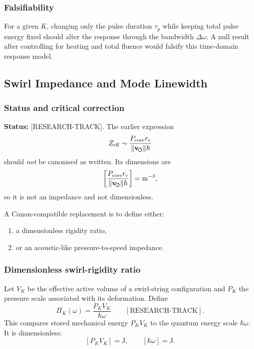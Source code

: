     \subsubsection*{Falsifiability}
        
        For a given \(K\), changing only the pulse duration \(\tau_p\) while keeping total pulse energy fixed should alter the response through the bandwidth \(\Delta\omega\). A null result after controlling for heating and total fluence would falsify this time-domain response model.

\subsection{Swirl Impedance and Mode Linewidth}
    \label{app:swirl-impedance-linewidth}
    
    \subsubsection*{Status and critical correction}
        
        \noindent
        \textbf{Status:} [RESEARCH-TRACK].
        The earlier expression
        \[
            Z_{\mathrm{eff}} \sim \frac{P_{\mathrm{core}}r_c}{\lVert\mathbf{v}_{\!\boldsymbol{\circlearrowleft}}\rVert\hbar}
        \]
        should \emph{not} be canonised as written. Its dimensions are
        \[
            \left[
                \frac{P_{\mathrm{core}}r_c}{\lVert\mathbf{v}_{\!\boldsymbol{\circlearrowleft}}\rVert\hbar}
            \right]
            =
            \mathrm{m^{-3}},
        \]
        so it is not an impedance and not dimensionless.
        
        A Canon-compatible replacement is to define either:
        
        \begin{enumerate}
            \item a dimensionless rigidity ratio,
            \item or an acoustic-like pressure-to-speed impedance.
        \end{enumerate}
    
    \subsubsection*{Dimensionless swirl-rigidity ratio}
        
        Let \(V_K\) be the effective active volume of a swirl-string configuration and \(P_K\) the pressure scale associated with its deformation. Define
        \begin{equation}
            \boxed{
                \Pi_K(\omega)
                =
                \frac{P_K V_K}{\hbar\omega}
            }
            \qquad
            [\mathrm{RESEARCH\text{-}TRACK}].
            \label{eq:dimensionless_swirl_rigidity}
        \end{equation}
        This compares stored mechanical energy \(P_KV_K\) to the quantum energy scale \(\hbar\omega\). It is dimensionless:
        \[
            [P_KV_K]=\mathrm{J},
            \qquad
            [\hbar\omega]=\mathrm{J}.
        \]
    
